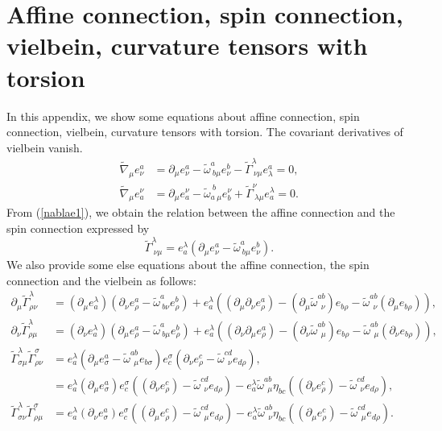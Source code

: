 \renewcommand{\theequation}{A.\arabic{equation}}
\setcounter{equation}{0}
\section{Affine connection, spin connection, vielbein, curvature tensors with torsion}
In this appendix, we show some equations about affine connection, spin connection, vielbein, 
curvature tensors with torsion. 
The covariant derivatives of vielbein vanish. 
\begin{align}
\tilde{\nabla}_\mu e^a_\nu 
& =\partial_\mu e^a_\nu-\tilde{\omega}^a_{\ b\mu}e^b_\nu-\tilde{\Gamma}_{\ \nu\mu}^\lambda e^a_\lambda=0, \label{nablae1}\\
\tilde{\nabla}_\mu e_a^\nu & =\partial_\mu e_a^\nu-\tilde{\omega}_{a\ \mu}^{\ b}e_b^\nu+\tilde{\Gamma}^\nu_{\ \lambda\mu}e_a^\lambda
=0. \label{nablae2}
\end{align}
From (\ref{nablae1}), we obtain the relation between the affine connection and the spin connection expressed by
\begin{equation}
\tilde{\Gamma}_{\ \nu\mu}^\lambda = e^\lambda_a(\partial_\mu e^a_\nu-\tilde{\omega}^a_{\ b\mu}e^b_\nu). \label{Gamma}
\end{equation}
We also provide some else equations about  
the affine connection, the spin connection and the vielbein as follows:
\begin{align}
\partial_\mu\tilde{\Gamma}^\lambda_{\rho\nu} & =
(\partial_\mu e_a^\lambda)(\partial_\nu e_\rho^a-\tilde{\omega}^a_{\ b\nu}e_\rho^b)
+e_a^\lambda\left((\partial_\mu\partial_\nu e_\rho^a)-(\partial_\mu\tilde{\omega}^{ab}_{\ \ \nu})e_{b\rho}
-\tilde{\omega}^{ab}_{\ \ \nu}(\partial_\mu e_{b \rho})\right), \\
\partial_\nu\tilde{\Gamma}^\lambda_{\rho\mu} & =
(\partial_\nu e_a^\lambda)(\partial_\mu e_\rho^a-\tilde{\omega}^a_{\ b\mu}e_\rho^b)
+e_a^\lambda\left((\partial_\nu\partial_\mu e_\rho^a)-(\partial_\nu\tilde{\omega}^{ab}_{\ \ \mu})e_{b\rho}
-\tilde{\omega}^{ab}_{\ \ \mu}(\partial_\nu e_{b \rho})\right), \\
\tilde{\Gamma}^\lambda_{\sigma\mu}\tilde{\Gamma}^\sigma_{\rho\nu} & =
e_a^\lambda(\partial_\mu e_\sigma^a-\tilde{\omega}^{ab}_{\ \ \mu}e_{b\sigma})
e^\sigma_c(\partial_\nu e_\rho^c-\tilde{\omega}^{cd}_{\ \ \nu}e_{d\rho}), \nonumber \\
& = e_a^\lambda(\partial_\mu e_\sigma^a)e_c^\sigma\left((\partial_\nu e_\rho^c)-\tilde{\omega}^{cd}_{\ \ \nu}e_{d\rho}\right)
-e_a^\lambda \tilde{\omega}^{ab}_{\ \ \mu}\eta_{bc}\left((\partial_\nu e_\rho^c)-\tilde{\omega}^{cd}_{\ \ \nu}e_{d\rho}\right), \\
\tilde{\Gamma}^\lambda_{\sigma\nu}\tilde{\Gamma}^\sigma_{\rho\mu} 
& = e_a^\lambda(\partial_\nu e_\sigma^a)e_c^\sigma\left((\partial_\mu e_\rho^c)-\tilde{\omega}^{cd}_{\ \ \mu}e_{d\rho}\right)
-e_a^\lambda \tilde{\omega}^{ab}_{\ \ \nu}\eta_{bc}\left((\partial_\mu e_\rho^c)-\tilde{\omega}^{cd}_{\ \ \mu}e_{d\rho}\right). 
\label{GammaGamma}
\end{align}
